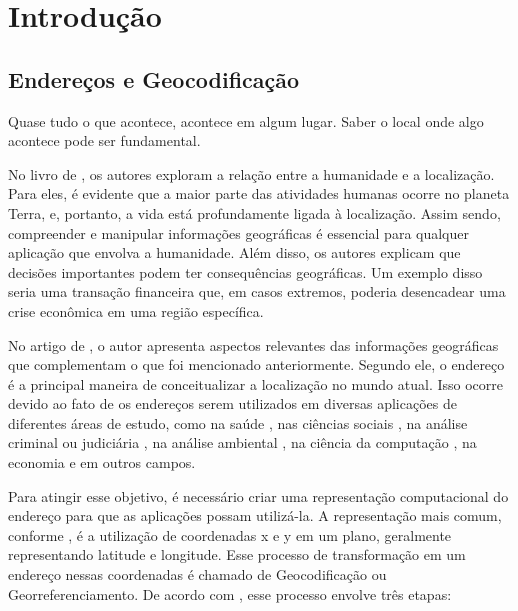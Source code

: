 \chapter{Introdução} \label{Introducao}

\section{Endereços e Geocodificação}

\epigraph{Quase tudo o que acontece, acontece em algum lugar. Saber o local onde algo acontece pode ser fundamental.}{\cite{longley2013}}

No livro de \cite{longley2013}, os autores exploram a relação entre a humanidade e a localização. Para eles, é evidente que a maior parte das atividades humanas ocorre no planeta Terra, e, portanto, a vida está profundamente ligada à localização. Assim sendo, compreender e manipular informações geográficas é essencial para qualquer aplicação que envolva a humanidade. Além disso, os autores explicam que decisões importantes podem ter consequências geográficas. Um exemplo disso seria uma transação financeira que, em casos extremos, poderia desencadear uma crise econômica em uma região específica.

No artigo de \cite{Zamberg2009}, o autor apresenta aspectos relevantes das informações geográficas que complementam o que foi mencionado anteriormente. Segundo ele, o endereço é a principal maneira de conceitualizar a localização no mundo atual. Isso ocorre devido ao fato de os endereços serem utilizados em diversas aplicações de diferentes áreas de estudo, como na saúde \cite{AmericaJournal2001, Kypri2009, Mazumdar2008}, nas ciências sociais \cite{Chow2011}, na análise criminal ou judiciária \cite{Olligschlaeger1998}, na análise ambiental \cite{Gilboa2006}, na ciência da computação \cite{Zamberg2009}, na economia \cite{Whitsel2006} e em outros campos.

Para atingir esse objetivo, é necessário criar uma representação computacional do endereço para que as aplicações possam utilizá-la. A representação mais comum, conforme \cite{Zamberg2009}, é a utilização de coordenadas x e y em um plano, geralmente representando latitude e longitude. Esse processo de transformação em um endereço nessas coordenadas é chamado de Geocodificação ou Georreferenciamento. De acordo com \cite{Zamberg2009}, esse processo envolve três etapas:

